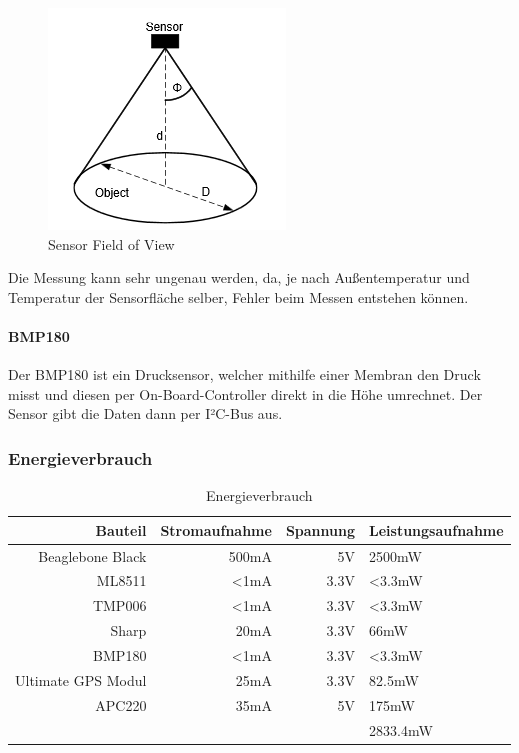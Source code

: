 \begin{figure}[h]
	\centering
	\includegraphics[scale=0.5]{2_Beschreibung_des_CANSAT/sensor_fov.png}
	\caption{Sensor Field of View}
	\label{sensor fov}
\end{figure}

Die Messung kann sehr ungenau werden, da, je nach Außentemperatur und Temperatur der Sensorfläche selber, Fehler beim Messen entstehen können.

\paragraph{BMP180}
Der BMP180 ist ein Drucksensor, welcher mithilfe einer Membran den Druck misst und diesen per On-Board-Controller direkt in die Höhe umrechnet. Der Sensor gibt die Daten dann per I²C-Bus aus.

\subsubsection{Energieverbrauch}
\begin{table}[H]
  \centering
    \begin{tabular}{rrrl}
    \toprule
    \textbf{Bauteil} & \textbf{Stromaufnahme} & \textbf{Spannung} & \textbf{Leistungsaufnahme} \\
    \midrule
    Beaglebone Black  & 500mA & 5V & 2500mW \\
    ML8511& <1mA & 3.3V & <3.3mW \\
    TMP006& <1mA& 3.3V& <3.3mW \\
    Sharp& 20mA & 3.3V& 66mW\\
    BMP180& <1mA& 3.3V& <3.3mW \\
    Ultimate GPS Modul& 25mA&3.3V& 82.5mW \\
    APC220& 35mA & 5V & 175mW\\

    \bottomrule
     & & &2833.4mW \\
    \bottomrule
    \end{tabular}%
    \caption{Energieverbrauch}
  \label{tab:budgetausgaben}%
\end{table}%
